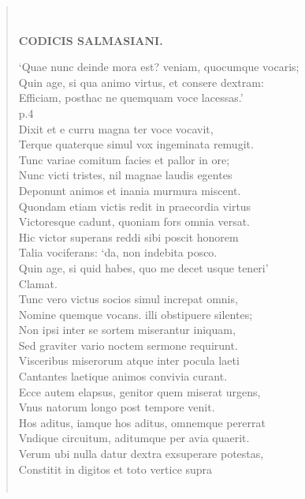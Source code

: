 \documentclass[11pt, a4paper]{report}
\begin{document}
\begin{verse}
        ﻿\pagebreak 
    \begin{center} \textbf{CODICIS SALMASIANI.} \end{center} \marginpar{[4]} ‘Quae nunc deinde mora est? veniam, quocumque vocaris; \\ Quin age, si qua animo virtus, et consere dextram: \\ Efficiam, posthac ne quemquam voce lacessas.’ \\ p.4 \\ Dixit et e curru magna ter voce vocavit, \\ Terque quaterque simul vox ingeminata remugit. \\ Tunc variae comitum facies et pallor in ore; \\ Nunc victi tristes, nil magnae laudis egentes \\ Deponunt animos et inania murmura miscent. \\ Quondam etiam victis redit in praecordia virtus \\ Victoresque cadunt, quoniam fors omnia versat. \\ Hic victor superans reddi sibi poscit honorem \\ Talia vociferans: ‘da, non indebita posco. \\ Quin age, si quid habes, quo me decet usque teneri’ \\ Clamat. \\ Tunc vero victus socios simul increpat omnis, \\ Nomine quemque vocans. illi obstipuere silentes; \\ Non ipsi inter se sortem miserantur iniquam, \\ Sed graviter vario noctem sermone requirunt. \\ Visceribus miserorum atque inter pocula laeti \\ Cantantes laetique animos convivia curant. \\ Ecce autem elapsus, genitor quem miserat urgens, \\ Vnus natorum longo post tempore venit. \\ Hos aditus, iamque hos aditus, omnemque pererrat \\ Vndique circuitum, aditumque per avia quaerit. \\ Verum ubi nulla datur dextra exsuperare potestas, \\  Constitit in digitos et toto vertice supra \\ 
        ﻿\pagebreak 

\end{verse}
\end{document}
